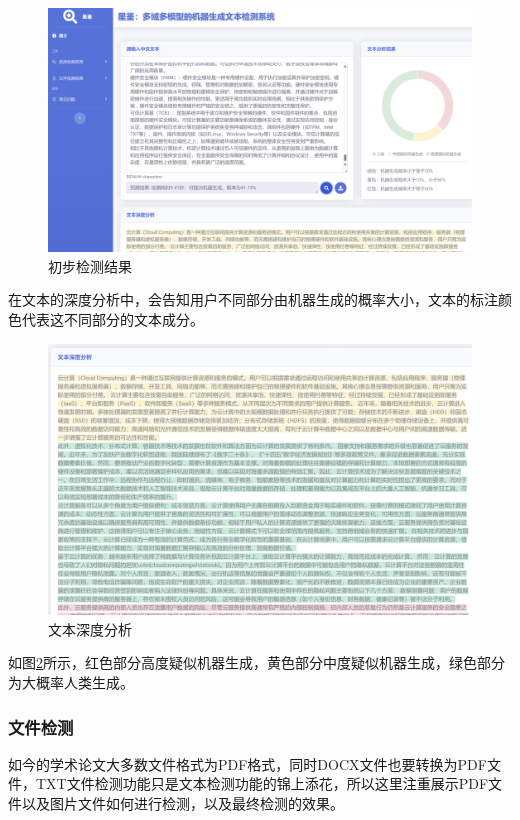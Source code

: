 \documentclass[a4paper]{report}
\begin{document}
\begin{figure}[H]
	\centering
	\includegraphics[width=\textwidth]{figures/文本检测结果.png}
	\caption{初步检测结果}
	\label{初步检测结果}
\end{figure}
在文本的深度分析中，会告知用户不同部分由机器生成的概率大小，文本的标注颜色代表这不同部分的文本成分。
\begin{figure}[H]
	\centering
	\includegraphics[width=\textwidth]{figures/文本深度分析.png}
	\caption{文本深度分析}
	\label{文本深度分析}
\end{figure}
如图\ref{文本深度分析}所示，红色部分高度疑似机器生成，黄色部分中度疑似机器生成，绿色部分为大概率人类生成。
\subsubsection{文件检测}%
如今的学术论文大多数文件格式为PDF格式，同时DOCX文件也要转换为PDF文件，TXT文件检测功能只是文本检测功能的锦上添花，所以这里注重展示PDF文件以及图片文件如何进行检测，以及最终检测的效果。
\end{document}

